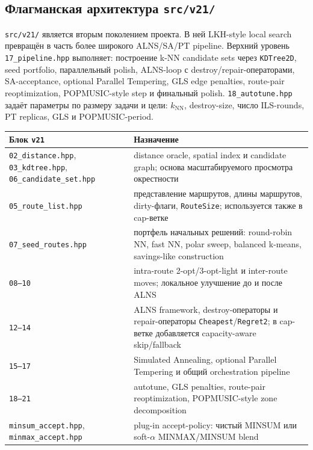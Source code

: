 \documentclass[14pt,a4paper]{extarticle}
\begin{document}
\subsection{Флагманская архитектура \texttt{src/v21/}}

\texttt{src/v21/} является вторым поколением проекта. В ней LKH-style local search превращён в часть более широкого ALNS/SA/PT pipeline. Верхний уровень \texttt{17\_pipeline.hpp} выполняет: построение k-NN candidate sets через \texttt{KDTree2D}, seed portfolio, параллельный polish, ALNS-loop с destroy/repair-операторами, SA-acceptance, optional Parallel Tempering, GLS edge penalties, route-pair reoptimization, POPMUSIC-style step и финальный polish. \texttt{18\_autotune.hpp} задаёт параметры по размеру задачи и цели: $k_{\mathrm{NN}}$, destroy-size, число ILS-rounds, PT replicas, GLS и POPMUSIC-period.

{\small\setlength{\tabcolsep}{2pt}
\begin{longtable}{>{\raggedright\arraybackslash}p{}>{\raggedright\arraybackslash}p{}}
\toprule
\textbf{Блок \texttt{v21}} & \textbf{Назначение}\\
\midrule
\endhead
\texttt{02\_distance.hpp}, \texttt{03\_kdtree.hpp}, \texttt{06\_candidate\_set.hpp} & distance oracle, spatial index и candidate graph; основа масштабируемого просмотра окрестности\\
\texttt{05\_route\_list.hpp} & представление маршрутов, длины маршрутов, dirty-флаги, \texttt{RouteSize}; используется также в cap-ветке\\
\texttt{07\_seed\_routes.hpp} & портфель начальных решений: round-robin NN, fast NN, polar sweep, balanced k-means, savings-like construction\\
\texttt{08--10} & intra-route 2-opt/3-opt-light и inter-route moves; локальное улучшение до и после ALNS\\
\texttt{12--14} & ALNS framework, destroy-операторы и repair-операторы \texttt{Cheapest}/\texttt{Regret2}; в cap-ветке добавляется capacity-aware skip/fallback\\
\texttt{15--17} & Simulated Annealing, optional Parallel Tempering и общий orchestration pipeline\\
\texttt{18--21} & autotune, GLS penalties, route-pair reoptimization, POPMUSIC-style zone decomposition\\
\texttt{minsum\_accept.hpp}, \texttt{minmax\_accept.hpp} & plug-in accept-policy: чистый MINSUM или soft-$\alpha$ MINMAX/MINSUM blend\\
\bottomrule
\end{longtable}
}
\end{document}
